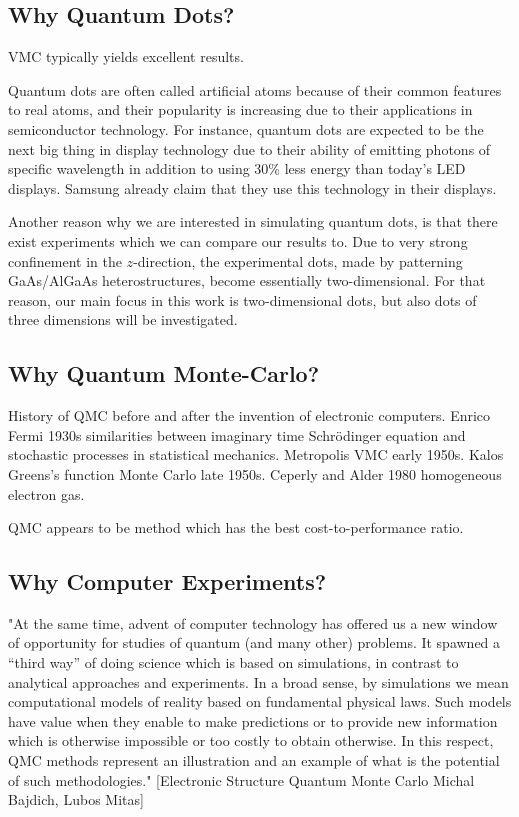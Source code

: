 \subsection*{Why Quantum Dots?}
VMC typically yields excellent results.

Quantum dots are often called artificial atoms because of their common features to real atoms, and their popularity is increasing due to their applications in semiconductor technology. For instance, quantum dots are expected to be the next big thing in display technology due to their ability of emitting photons of specific wavelength in addition to using 30\% less energy than today's LED displays.\cite{manders_8.3:_2015} Samsung already claim that they use this technology in their displays.\cite{noauthor_2019_nodate}

Another reason why we are interested in simulating quantum dots, is that there exist experiments which we can compare our results to. Due to very strong confinement in the $z$-direction, the experimental dots, made by patterning GaAs/AlGaAs heterostructures, become essentially two-dimensional. \cite{marzin_photoluminescence_1994}\cite{brunner_sharp-line_1994} For that reason, our main focus in this work is two-dimensional dots, but also dots of three dimensions will be investigated. 

\subsection*{Why Quantum Monte-Carlo?}
History of QMC before and after the invention of electronic computers. Enrico Fermi 1930s similarities between imaginary time Schrödinger equation and stochastic processes in statistical mechanics. Metropolis VMC early 1950s. Kalos Greens's function Monte Carlo late 1950s. Ceperly and Alder 1980 homogeneous electron gas. 

QMC appears to be method which has the best cost-to-performance ratio.

\subsection*{Why Computer Experiments?}
"At the same time, advent of computer technology has
offered us a new window of opportunity for studies of quantum (and many other) problems. It
spawned a “third way” of doing science which is based on simulations, in contrast to analytical
approaches and experiments. In a broad sense, by simulations we mean computational models of
reality based on fundamental physical laws. Such models have value when they enable to make
predictions or to provide new information which is otherwise impossible or too costly to obtain
otherwise. In this respect, QMC methods represent an illustration and an example of what is the
potential of such methodologies." [Electronic Structure Quantum Monte Carlo Michal Bajdich, Lubos Mitas]  

